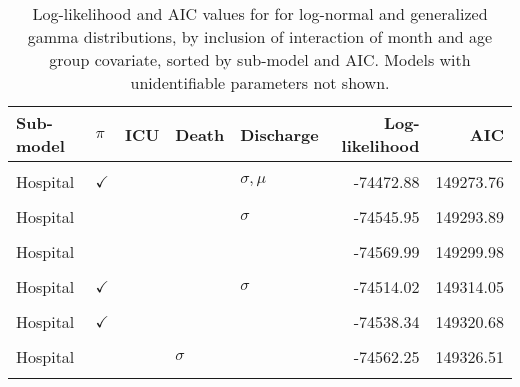 \begin{table}[!h]
\centering
\caption{\label{tab:gof_int_age}Log-likelihood and AIC values for for log-normal and generalized gamma distributions, by inclusion of interaction of month and age group covariate, sorted by sub-model and AIC. Models with unidentifiable parameters not shown.}
\centering
\begin{tabular}[t]{lllllrr}
\toprule
Sub-model & $\pi$ & ICU & Death & Discharge & Log-likelihood & AIC\\
\midrule
\cellcolor{gray!10}{Hospital} & \cellcolor{gray!10}{} & \cellcolor{gray!10}{} & \cellcolor{gray!10}{} & \cellcolor{gray!10}{$\sigma, \mu$} & \cellcolor{gray!10}{-74507.16} & \cellcolor{gray!10}{149258.33}\\
Hospital & $\checkmark$ &  &  & $\sigma, \mu$ & -74472.88 & 149273.76\\
\cellcolor{gray!10}{Hospital} & \cellcolor{gray!10}{} & \cellcolor{gray!10}{} & \cellcolor{gray!10}{} & \cellcolor{gray!10}{$\mu$} & \cellcolor{gray!10}{-74539.05} & \cellcolor{gray!10}{149280.10}\\
Hospital &  &  &  & $\sigma$ & -74545.95 & 149293.89\\
\cellcolor{gray!10}{Hospital} & \cellcolor{gray!10}{$\checkmark$} & \cellcolor{gray!10}{} & \cellcolor{gray!10}{} & \cellcolor{gray!10}{$\mu$} & \cellcolor{gray!10}{-74506.44} & \cellcolor{gray!10}{149298.89}\\
Hospital &  &  &  &  & -74569.99 & 149299.98\\
\cellcolor{gray!10}{Hospital} & \cellcolor{gray!10}{} & \cellcolor{gray!10}{$\mu$} & \cellcolor{gray!10}{} & \cellcolor{gray!10}{} & \cellcolor{gray!10}{-74550.31} & \cellcolor{gray!10}{149302.62}\\
Hospital & $\checkmark$ &  &  & $\sigma$ & -74514.02 & 149314.05\\
\cellcolor{gray!10}{Hospital} & \cellcolor{gray!10}{} & \cellcolor{gray!10}{} & \cellcolor{gray!10}{$\mu$} & \cellcolor{gray!10}{} & \cellcolor{gray!10}{-74558.15} & \cellcolor{gray!10}{149318.29}\\
Hospital & $\checkmark$ &  &  &  & -74538.34 & 149320.68\\
\cellcolor{gray!10}{Hospital} & \cellcolor{gray!10}{$\checkmark$} & \cellcolor{gray!10}{$\mu$} & \cellcolor{gray!10}{} & \cellcolor{gray!10}{} & \cellcolor{gray!10}{-74517.84} & \cellcolor{gray!10}{149321.68}\\
Hospital &  &  & $\sigma$ &  & -74562.25 & 149326.51\\
\cellcolor{gray!10}{Hospital} & \cellcolor{gray!10}{$\checkmark$} & \cellcolor{gray!10}{} & \cellcolor{gray!10}{$\mu$} & \cellcolor{gray!10}{} & \cellcolor{gray!10}{-74525.54} & \cellcolor{gray!10}{149337.09}\\

\end{tabular}
\end{table}
